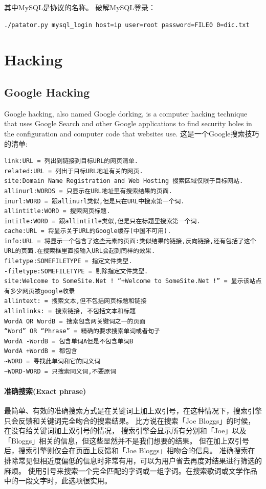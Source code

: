 \documentclass{book}
\begin{document}
其中MySQL是协议的名称。
破解MySQL登录：

\begin{lstlisting}[language=Bash]
./patator.py mysql_login host=ip user=root password=FILE0 0=dic.txt
\end{lstlisting}


\section{Hacking}

\subsection{Google Hacking}

Google hacking, also named Google dorking, 
is a computer hacking technique that uses Google Search and other 
Google applications to find security holes in the configuration and computer code that websites use.
这是一个Google搜索技巧的清单:

\begin{lstlisting}
link:URL = 列出到链接到目标URL的网页清单.
related:URL = 列出于目标URL地址有关的网页.
site:Domain Name Registration and Web Hosting 搜索区域仅限于目标网站.
allinurl:WORDS = 只显示在URL地址里有搜索结果的页面.
inurl:WORD = 跟allinurl类似,但是只在URL中搜索第一个词.
allintitle:WORD = 搜索网页标题.
intitle:WORD = 跟allintitle类似,但是只在标题里搜索第一个词.
cache:URL = 将显示关于URL的Google缓存(中国不可用).
info:URL = 将显示一个包含了这些元素的页面:类似结果的链接,反向链接,还有包括了这个URL的页面.在搜索框里直接输入URL会起到同样的效果.
filetype:SOMEFILETYPE = 指定文件类型.
-filetype:SOMEFILETYPE = 剔除指定文件类型.
site:Welcome to SomeSite.Net ! “+Welcome to SomeSite.Net !” = 显示该站点有多少网页被google收录
allintext: = 搜索文本,但不包括网页标题和链接
allinlinks: = 搜索链接, 不包括文本和标题
WordA OR WordB = 搜索包含两关键词之一的页面
“Word” OR “Phrase” = 精确的要求搜索单词或者句子
WordA -WordB = 包含单词A但是不包含单词B
WordA +WordB = 都包含
~WORD = 寻找此单词和它的同义词
~WORD-WORD = 只搜索同义词,不要原词
\end{lstlisting}

\paragraph{准确搜索(Exact phrase)}
最简单、有效的准确搜索方式是在关键词上加上双引号，在这种情况下，搜索引擎只会反馈和关键词完全吻合的搜索结果。
比方说在搜索「Joe Bloggs」的时候，在没有给关键词加上双引号的情况，
搜索引擎会显示所有分别和「Joe」以及「Bloggs」相关的信息，但这些显然并不是我们想要的结果。
但在加上双引号后，搜索引擎则仅会在页面上反馈和「Joe Bloggs」相吻合的信息。
准确搜索在排除常见但相近度偏低的信息时非常有用，可以为用户省去再度对结果进行筛选的麻烦。
使用引号来搜索一个完全匹配的字词或一组字词。在搜索歌词或文学作品中的一段文字时，此选项很实用。
\end{document}
